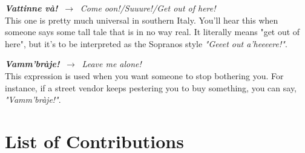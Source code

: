 \documentclass[
	openany, %
	parskip=full, %
	12pt, %
	a4paper, %
]{conferencebooklet} %
\begin{document}
\begin{adjustwidth}{10pt}{20pt}
\begin{multicols}{2}
    
    \RaggedRight
    \textbf{\textit{Vattinne và!}} $\ \rightarrow \ $ \textit{Come oon!/Suuure!/Get out of here!} \\
    \justifying
    This one is pretty much universal in southern Italy. You’ll hear this when someone says some tall tale that is in no way real. It literally means "get out of here", but it’s to be interpreted as the Sopranos style \textit{"Geeet out a’heeeere!"}.

    \RaggedRight
    \textbf{\textit{Vamm’bràje!}} $\ \rightarrow \ $ \textit{Leave me alone!} \\
    \justifying
    This expression is used when you want someone to stop bothering you. For instance, if a street vendor keeps pestering you to buy something, you can say, \textit{"Vamm’bràje!"}.
\end{multicols}
\end{adjustwidth}




\chapter{List of Contributions}


\end{document}
